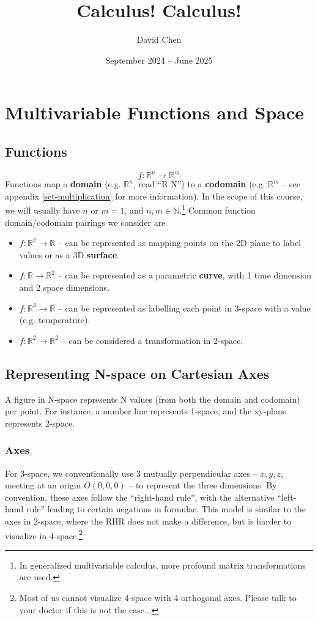 \documentclass{article}
\title{Calculus! Calculus!}
\author{David Chen}
\date{September 2024 -- June 2025}
\begin{document}
\maketitle

\section{Multivariable Functions and Space}

\subsection{Functions}
$$f: \mathbb{R}^n \to \mathbb{R}^m$$
Functions map a \textbf{domain} (e.g. $\mathbb{R}^n$, read ``R N'') to a \textbf{codomain} (e.g. $\mathbb{R}^m$ -- see appendix \ref{set-multiplication} for more information). In the scope of this course, we will usually have $n$ or $m = 1$, and $n,m \in \mathbb{N}$.\footnote{In generalized multivariable calculus, more profound matrix transformations are used.}
Common function domain/codomain pairings we consider are
\begin{itemize}
    \item $f: \mathbb{R}^2 \to \mathbb{R}$ -- can be represented as mapping points on the 2D plane to label values or as a 3D \textbf{surface}.
    \item $f: \mathbb{R} \to \mathbb{R}^2$ -- can be represented as a parametric \textbf{curve}, with 1 time dimension and 2 space dimensions.
    \item $f: \mathbb{R}^3 \to \mathbb{R}$ -- can be represented as labelling each point in 3-space with a value (e.g. temperature).
    \item $f: \mathbb{R}^2 \to \mathbb{R}^2$ -- can be considered a transformation in 2-space.
\end{itemize}

\subsection{Representing N-space on Cartesian Axes}
A figure in N-space represents N values (from both the domain and codomain) per point. For instance, a number line represents 1-space, and the xy-plane represents 2-space.

\subsubsection{Axes}
For 3-space, we conventionally use 3 mutually perpendicular axes -- $x, y, z$, meeting at an origin $O(0,0,0)$ -- to represent the three dimensions. By convention, these axes follow the ``right-hand rule'', with the alternative ``left-hand rule'' leading to certain negations in formulae.
This model is similar to the axes in 2-space, where the RHR does not make a difference, but is harder to visualize in 4-space.\footnote{Most of us cannot visualize 4-space with 4 orthogonal axes. Please talk to your doctor if this is not the case...}
\end{document}
